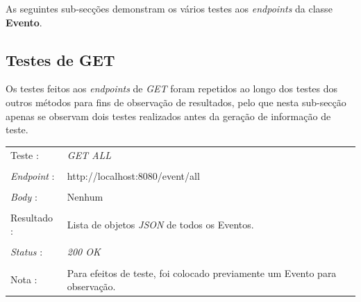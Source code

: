 As seguintes sub-secções demonstram os vários testes aos \emph{endpoints} da classe {\bf Evento}.\\


\subsection{Testes de GET}\label{511}
Os testes feitos aos \emph{endpoints} de \emph{GET} foram repetidos ao longo dos testes dos outros métodos para fins de observação de resultados, pelo que nesta sub-secção apenas se observam dois testes realizados antes da geração de informação de teste.\\


\begin{tabular}{ll}
	Teste : & \emph{GET ALL}\\
	\\
	\emph{Endpoint} : & http://localhost:8080/event/all\\
	\\
	\emph{Body} : & Nenhum\\
	\\
	Resultado : & Lista de objetos \emph{JSON} de todos os Eventos.\\
	\\
	\emph{Status} : & \emph{200 OK}\\
	\\
	Nota : & Para efeitos de teste, foi colocado previamente um Evento para observação.\\
\end{tabular}

